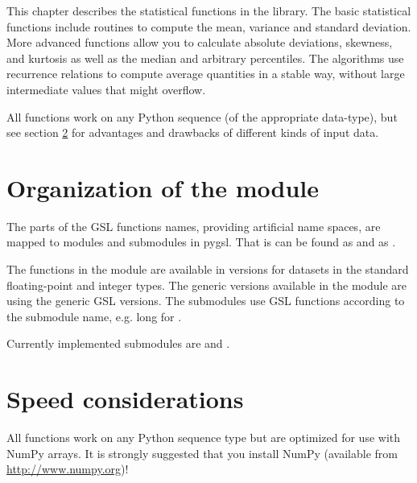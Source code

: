 
This chapter describes the statistical functions in the library.  The
basic statistical functions include routines to compute the mean,
variance and standard deviation. More advanced functions allow you to
calculate absolute deviations, skewness, and kurtosis as well as the
median and arbitrary percentiles.  The algorithms use recurrence
relations to compute average quantities in a stable way, without large
intermediate values that might overflow. 

All functions work on any Python sequence (of the appropriate
data-type), but see section \ref{sec:stat-speed-considerations} for
advantages and drawbacks of different kinds of input data.


\section{Organization of the module}
\label{sec:stat-organization}

The parts of the GSL functions names, providing artificial name spaces,
are mapped to modules and submodules in pygsl.  That is
 can be found as  and
 as .

The functions in the module are available in versions for datasets in
the standard floating-point and integer types. The generic versions
available in the  module are using the generic
GSL  versions.  The submodules use GSL functions according
to the submodule name, e.g. long for .

Currently implemented submodules are  and
.



\section{Speed considerations}
\label{sec:stat-speed-considerations}

All functions work on any Python sequence type but are optimized for use
with NumPy arrays. It is strongly suggested that you install NumPy
(available from \url{http://www.numpy.org})!

